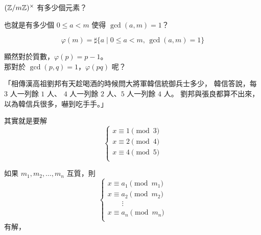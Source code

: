 \documentclass[standalone]{beamer}
\begin{document}
\begin{frame}
  \begin{missue}
    \centering
    $(\mathbb{Z} / m\mathbb{Z})^\times$ 有多少個元素？
  \end{missue}
  \pause \disskip

  也就是有多少個 $0 \leq a < m$ 使得 $\gcd(a, m) = 1$？ \\[\parskip]
  \pause

  \begin{definition} \vspace*{-1em}
    \[ \varphi(m) = \sharp \{ a \mid 0 \leq a < m, \, \gcd(a, m) = 1\} \]
  \end{definition}
  \pause \disskip
  顯然對於質數，$\varphi(p) = p-1$。 \\ \pause
  那對於 $\gcd(p, q) = 1$，$\varphi(p q)$ 呢？
\end{frame}

\begin{frame}
  「相傳漢高祖劉邦有天趁喝酒的時候問大將軍韓信統御兵士多少，
韓信答說，每 $3$ 人一列餘 $1$ 人、 $4$ 人一列餘 $2$ 人、$5$ 人一列餘 $4$ 人。
劉邦與張良都算不出來，以為韓信兵很多，嚇到吃手手。」
\pause

其實就是要解
\[
  \begin{cases}
    x \equiv 1 \pmod{3} \\
    x \equiv 2 \pmod{4} \\
    x \equiv 4 \pmod{5} \\
  \end{cases}
\]
\end{frame}

\begin{frame}
  \begin{theorem}[中國剩餘定理]
    如果 $m_1, m_2, \dots, m_n$ \alert<1>{互質}，則
    \[
      \begin{cases}
        x \equiv a_1 \pmod{m_1} \\
        x \equiv a_2 \pmod{m_2} \\
        \quad \quad \vdots \\
        x \equiv a_n \pmod{m_n} \\
      \end{cases}
    \]
    有解，
  \end{theorem}
\end{frame}
\end{document}
